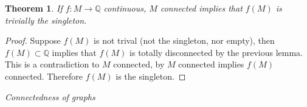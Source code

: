 \documentclass[letter]{article}
\newtheorem{theorem}{Theorem}
\newenvironment{menumerate}{%
  \edef\backupindent{\the\parindent}%
  \enumerate%
  \setlength{\parindent}{\backupindent}%
}{\endenumerate}
\begin{document}
\begin{menumerate}
\begin{menumerate}
				\begin{theorem}
					If $f:M\to\mathbb{Q}$ continuous, $M$ connected implies that $f(M)$ is trivially the singleton.
				\end{theorem}
				\begin{proof}
					Suppose $f(M)$ is not trival (not the singleton, nor empty), then $f(M) \subset \mathbb{Q}$ implies that $f(M)$ is totally disconnected by the previous lemma. This is a contradiction to $M$ connected, by $M$ connected implies $f(M)$ connected. Therefore $f(M)$ is the singleton.
				\end{proof}
		\end{menumerate}
	\setcounter{enumi}{71}
	\item \emph{Connectedness of graphs}
		\begin{menumerate}
			\item \emph{}
		\end{menumerate}
	\setcounter{enumi}{101}
	\item
	\item
	\setcounter{enumi}{107}
	\item
\end{menumerate}
\end{document}
